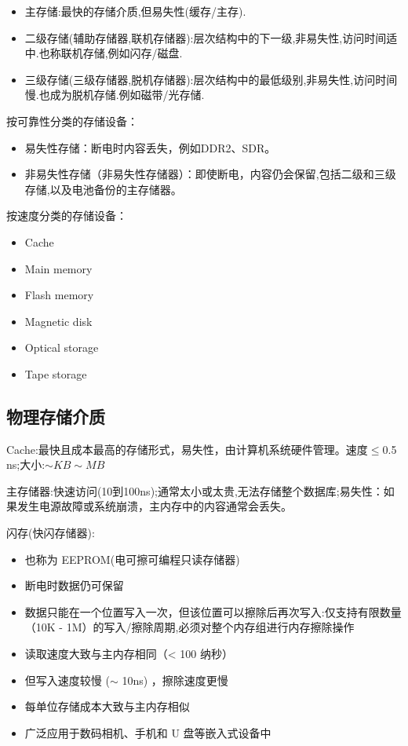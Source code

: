 \begin{itemize}
    \item 主存储:最快的存储介质,但易失性(缓存/主存).
    \item 二级存储(辅助存储器,联机存储器):层次结构中的下一级,非易失性,访问时间适中.也称联机存储,例如闪存/磁盘.
    \item 三级存储(三级存储器,脱机存储器):层次结构中的最低级别,非易失性,访问时间慢.也成为脱机存储.例如磁带/光存储.
\end{itemize}

按可靠性分类的存储设备：

\begin{itemize}
    \item 易失性存储：断电时内容丢失，例如DDR2、SDR。
    \item 非易失性存储（非易失性存储器）：即使断电，内容仍会保留,包括二级和三级存储,以及电池备份的主存储器。
\end{itemize}

按速度分类的存储设备：

\begin{itemize}
    \item Cache
    \item Main memory 
    \item Flash memory
    \item Magnetic disk
    \item Optical storage
    \item Tape storage
\end{itemize}

\subsection{物理存储介质}

Cache:最快且成本最高的存储形式，易失性，由计算机系统硬件管理。速度$\leq$0.5 ns;大小:$\sim KB \sim MB$

主存储器:快速访问(10到100ns);通常太小或太贵,无法存储整个数据库;易失性：如果发⽣电源故障或系统崩溃，主内存中的内容通常会丢失。

闪存(快闪存储器):

\begin{itemize}
    \item 也称为 EEPROM(电可擦可编程只读存储器)
    \item 断电时数据仍可保留
    \item 数据只能在一个位置写入一次，但该位置可以擦除后再次写入:仅支持有限数量（10K - 1M）的写入/擦除周期,必须对整个内存组进行内存擦除操作
    \item 读取速度⼤致与主内存相同（< 100 纳秒）
    \item 但写入速度较慢 ($\sim$ 10ns) ，擦除速度更慢
    \item 每单位存储成本⼤致与主内存相似
    \item 广泛应用于数码相机、手机和 U 盘等嵌入式设备中
\end{itemize}


